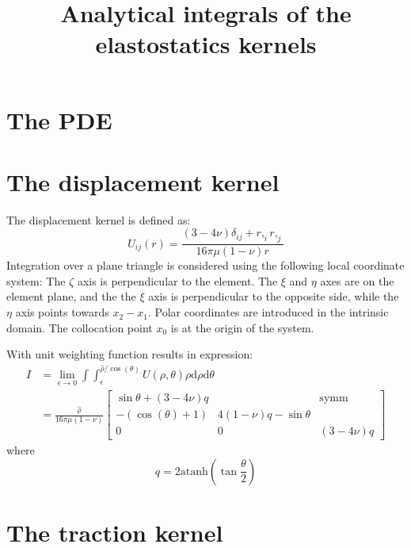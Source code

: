\documentclass{article}
\title{Analytical integrals of the elastostatics kernels}
\newcommand{\atanh}{\mathrm{atanh}}
\newcommand{\td}{\mathrm{d}}
\begin{document}
\maketitle

\section{The PDE}

\section{The displacement kernel}

The displacement kernel is defined as:
%
\begin{equation}
U_{ij}(r) = \frac{(3-4\nu)\delta_{ij} + r,_i r,_j}{16\pi\mu(1-\nu)r}
\end{equation}
%
Integration over a plane triangle is considered using the following local coordinate system:
The $\zeta$ axis is perpendicular to the element. The $\xi$ and $\eta$ axes are on the element plane, and the the $\xi$ axis is perpendicular to the opposite side, while the $\eta$ axis points towards $x_2-x_1$. Polar coordinates are introduced in the intrinsic domain. The collocation point $x_0$ is at the origin of the system.

With unit weighting function  results in expression:
%
\begin{align}
I &= \lim_{\epsilon\to 0} \int \int_{\epsilon}^{\hat{\rho}/\cos(\theta)} U(\rho,\theta) \rho \td \rho \td \theta \nonumber \\
&= \frac{\hat{\rho}}{16\pi\mu(1-\nu)}
\begin{bmatrix}
\sin\theta + (3-4\nu) q &  &  \text{symm} \\ 
- \left(\cos\!\left(\theta\right) + 1\right) &  4 (1-\nu) q - \sin\theta & \\
0 & 0 & \left(3-4\nu\right)q 
\end{bmatrix}
\end{align}
%
where
%
\begin{equation}
q = 2 \atanh\left(\tan\frac{\theta}{2}\right)
\end{equation}

\section{The traction kernel}
\end{document}
